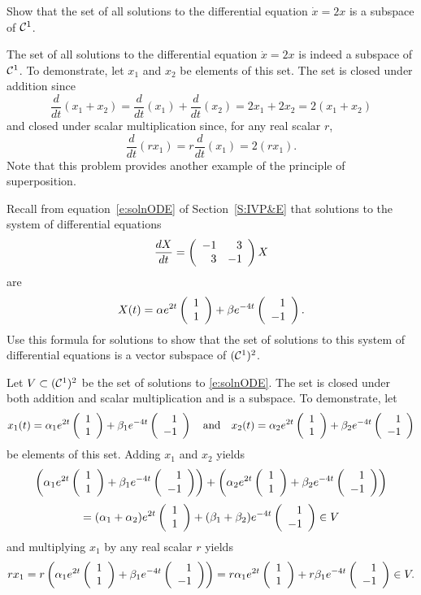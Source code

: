 \documentclass{ximera}
\begin{document}
\begin{exercise} \label{c5.1.8}
Show that the set of all solutions to the differential equation
$\dot{x}=2x$ is a subspace of ${\cal C}^1$.

\begin{solution}

The set of all solutions to the differential equation $\dot{x} = 2x$ is
indeed a subspace of ${\cal C}^1$.  To demonstrate, let $x_1$ and $x_2$
be elements of this set.  The set is closed under addition since
\[
\frac{d}{dt}(x_1 + x_2) = \frac{d}{dt}(x_1) + \frac{d}{dt}(x_2)
= 2x_1 + 2x_2 = 2(x_1 + x_2)
\]
and closed under scalar multiplication since, for any real scalar $r$,
\[
\frac{d}{dt}(rx_1) = r\frac{d}{dt}(x_1) = 2(rx_1).
\]
Note that this problem provides another example of the principle of
superposition.

\end{solution}
\end{exercise}

\begin{exercise} \label{c5.1.9}
Recall from equation~\eqref{e:solnODE} of Section~\ref{S:IVP&E}
that solutions to the system of differential equations
\[
\frac{dX}{dt} = \left(\begin{array}{rr} -1 & 3\\ 3 &-1\end{array}\right) X
\]
are
\[
X(t) = \alpha e^{2t}\left(\begin{array}{r} 1 \\ 1\end{array}\right) + \beta e^{-4t}\left(\begin{array}{r} 1 \\ -1\end{array}\right).
\]
Use this formula for solutions to show that the set of solutions
to this system of differential equations is a vector subspace of
$({\cal C}^1)^2$.

\begin{solution}

Let $V \subset ({\cal C}^1)^2$ be the set of solutions to \eqref{e:solnODE}.
The set is closed under both addition and scalar multiplication and
is a subspace.
To demonstrate, let
\[
x_1(t) = \alpha_1 e^{2t}\left(\begin{array}{r} 1 \\ 1\end{array}\right) +
\beta_1 e^{-4t}\left(\begin{array}{r} 1 \\ -1\end{array}\right) \quad\mbox{and}\quad x_2(t) =
\alpha_2 e^{2t}\left(\begin{array}{r} 1 \\ 1\end{array}\right) + \beta_2 e^{-4t}\left(\begin{array}{r} 1 \\ -1\end{array}\right)
\]
be elements of this set.  Adding $x_1$ and $x_2$ yields
\[
\left(\alpha_1 e^{2t}\left(\begin{array}{r} 1 \\ 1\end{array}\right) +
\beta_1 e^{-4t}\left(\begin{array}{r} 1 \\ -1\end{array}\right)\right) +
\left(\alpha_2 e^{2t}\left(\begin{array}{r} 1 \\ 1\end{array}\right)
+ \beta_2 e^{-4t}\left(\begin{array}{r} 1 \\ -1\end{array}\right)\right)
\]
\[
= (\alpha_1 + \alpha_2)e^{2t}\left(\begin{array}{r} 1 \\ 1\end{array}\right) +
(\beta_1 + \beta_2) e^{-4t}\left(\begin{array}{r} 1 \\ -1\end{array}\right) \in V
\]
and multiplying $x_1$ by any real scalar $r$ yields
\[
rx_1 = r\left(\alpha_1 e^{2t}\left(\begin{array}{r} 1 \\ 1\end{array}\right) +
\beta_1 e^{-4t}\left(\begin{array}{r} 1 \\ -1\end{array}\right)\right) = r\alpha_1 e^{2t}\left(\begin{array}{r} 1 \\ 1\end{array}\right) +
r\beta_1 e^{-4t}\left(\begin{array}{r} 1 \\ -1\end{array}\right) \in V.
\]



\end{solution}
\end{exercise}
\end{document}
